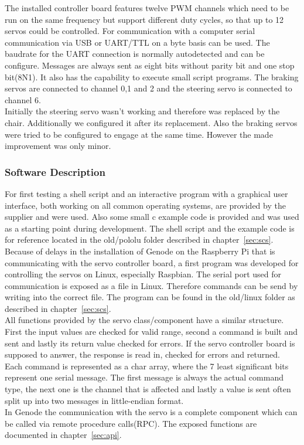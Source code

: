 The installed controller board features twelve PWM channels which need to be run on the same frequency but support different duty cycles, so that up to 12 servos could be controlled. For communication with a computer serial communication via USB or UART/TTL on a byte basis can be used. The baudrate for the UART connection is normally autodetected and can be configure. Messages are always sent as eight bits without parity bit and one stop bit(8N1). It also has the capability to execute small script programs. The braking servos are connected to channel 0,1 and 2 and the steering servo is connected to channel 6.\\

Initially the steering servo wasn't working and therefore was replaced by the chair. Additionally we configured it after its replacement. Also the braking servos were tried to be configured to engage at the same time. However the made improvement was only minor.

\subsubsection{Software Description}
For first testing a shell script and an interactive program with a graphical user interface, both working on all common operating systems, are provided by the supplier and were used. Also some small c example code is provided and was used as a starting point during development. The shell script and the example code is for reference located in the old/pololu folder described in chapter~\ref{sec:scs}.\\

Because of delays in the installation of Genode on the Raspberry Pi that is communicating with the servo controller board, a first program was developed for controlling the servos on Linux, especially Raspbian. The serial port used for communication is exposed as a file in Linux. Therefore commands can be send by writing into the correct file. The program can be found in the old/linux folder as described in chapter~\ref{sec:scs}.\\

All functions provided by the servo class/component have a similar structure. First the input values are checked for valid range, second a command is built and sent and lastly its return value checked for errors. If the servo controller board is supposed to answer, the response is read in, checked for errors and returned. Each command is represented as a char array, where the 7 least significant bits represent one serial message. The first message is always the actual command type, the next one is the channel that is affected and lastly a value is sent often split up into two messages in little-endian format.\\

In Genode the communication with the servo is a complete component which can be called via remote procedure calls(RPC). The exposed functions are documented in chapter~\ref{sec:api}.